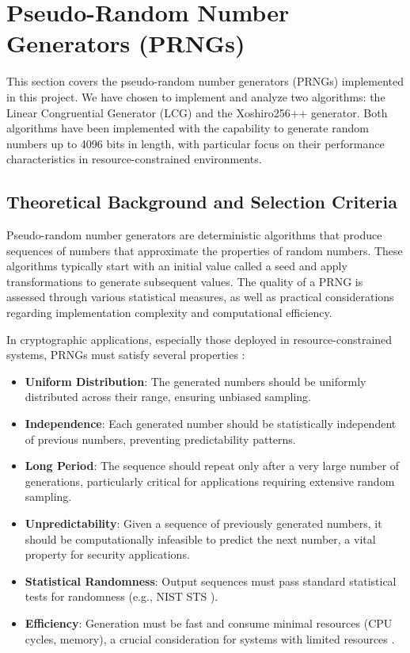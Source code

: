 \section{Pseudo-Random Number Generators (PRNGs)}

This section covers the pseudo-random number generators (PRNGs) implemented in this project. We have chosen to implement and analyze two algorithms: the Linear Congruential Generator (LCG) and the Xoshiro256++ generator. Both algorithms have been implemented with the capability to generate random numbers up to 4096 bits in length, with particular focus on their performance characteristics in resource-constrained environments.

\subsection{Theoretical Background and Selection Criteria}

Pseudo-random number generators are deterministic algorithms that produce sequences of numbers that approximate the properties of random numbers. These algorithms typically start with an initial value called a seed and apply transformations to generate subsequent values. The quality of a PRNG is assessed through various statistical measures, as well as practical considerations regarding implementation complexity and computational efficiency.

In cryptographic applications, especially those deployed in resource-constrained systems, PRNGs must satisfy several properties \cite{prng_iot}:

\begin{itemize}
    \item \textbf{Uniform Distribution}: The generated numbers should be uniformly distributed across their range, ensuring unbiased sampling.
    
    \item \textbf{Independence}: Each generated number should be statistically independent of previous numbers, preventing predictability patterns.
    
    \item \textbf{Long Period}: The sequence should repeat only after a very large number of generations, particularly critical for applications requiring extensive random sampling.
    
    \item \textbf{Unpredictability}: Given a sequence of previously generated numbers, it should be computationally infeasible to predict the next number, a vital property for security applications.
    
    \item \textbf{Statistical Randomness}: Output sequences must pass standard statistical tests for randomness (e.g., NIST STS \cite{nist_test_suite}).
    
    \item \textbf{Efficiency}: Generation must be fast and consume minimal resources (CPU cycles, memory), a crucial consideration for systems with limited resources \cite{embedded_prng}.
\end{itemize}

